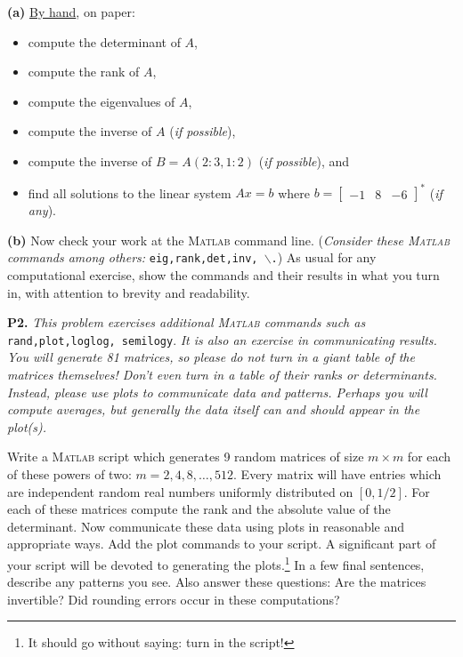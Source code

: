 \documentclass[12pt]{amsart}
\newcommand{\prob}[1]{\bigskip\noindent\textbf{#1.}\quad }
\newcommand{\epart}[1]{\medskip\noindent\textbf{(#1)}\quad }
\newcommand{\Matlab}{\textsc{Matlab}\xspace}
\begin{document}
\epart{a} \underline{By hand}, on paper:\begin{itemize}
\item compute the determinant of $A$,
\item compute the rank of $A$,
\item compute the eigenvalues of $A$,
\item compute the inverse of $A$ (\emph{if possible}),
\item compute the inverse of $B=A(2:3,1:2)$ (\emph{if possible}), and
\item find all solutions to the linear system $Ax=b$ where $b = \begin{bmatrix} -1 & 8 & -6 \end{bmatrix}^*$ (\emph{if any}).
\end{itemize}

\epart{b} Now check your work at the \Matlab command line.  (\emph{Consider these \Matlab commands among others:} \texttt{eig,rank,det,inv,\,$\backslash$\;.})  As usual for any computational exercise, show the commands and their results in what you turn in, with attention to brevity and readability.


\clearpage
\newpage
\prob{P2}  \emph{This problem exercises additional \Matlab commands such as} \texttt{rand,plot,loglog, semilogy}. \emph{It is also an exercise in communicating results.  You will generate 81 matrices, so please do \emph{not} turn in a giant table of the matrices themselves!  Don't even turn in a table of their ranks or determinants.  Instead, please use plots to communicate data and patterns.  Perhaps you will compute averages, but generally the data itself can and should appear in the plot(s).}

\smallskip
Write a \Matlab script which generates 9 random matrices of size $m\times m$ for each of these powers of two: $m=2,4,8,\dots,512$.  Every matrix will have entries which are independent random real numbers uniformly distributed on $[0,1/2]$.  For each of these matrices compute the rank and the absolute value of the determinant.  Now communicate these data using plots in reasonable and appropriate ways.  Add the plot commands to your script.  A significant part of your script will be devoted to generating the plots.\footnote{It should go without saying: turn in the script!}  In a few final sentences, describe any patterns you see.  Also answer these questions: Are the matrices invertible? Did rounding errors occur in these computations?
\end{document}
